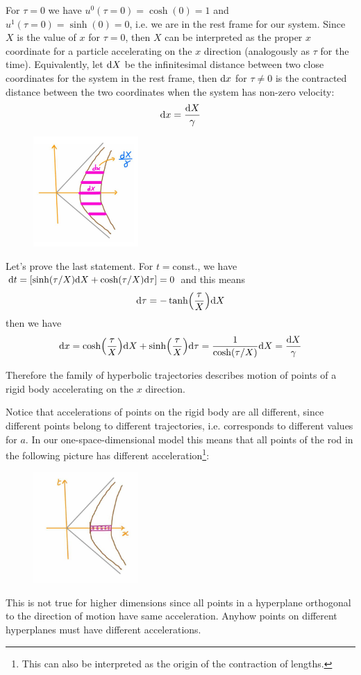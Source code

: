 \documentclass[../main/main.tex]{subfiles}
\begin{document}
For $\tau=0$ we have $u^0(\tau=0)=\cosh(0)=1$ and $u^1(\tau=0)=\sinh(0)=0$, i.e. we are in the rest frame for our system. Since $X$ is the value of $x$ for $\tau=0$, then $X$ can be interpreted as the proper $x$ coordinate for a particle accelerating on the $x$ direction (analogously as $\tau$ for the time). Equivalently, let $\textup{d} X$ be the infinitesimal distance between two close coordinates for the system in the rest frame, then $\textup{d} x$ for $\tau\neq0$ is the contracted distance between the two coordinates when the system has non-zero velocity:
\[\textup{d} x=\frac{\textup{d} X}\gamma\]
\begin{figure}[H]
\centering
\includegraphics[width=4cm]{../img/X-proper-lenght-Rindler.jpg}
\end{figure}
Let's prove the last statement. For $t=$const., we have $\textup{d} t=[\sinh(\tau/X)\textup{d} X+\cosh(\tau/X)\textup{d}\tau]=0$ and this means
\[\textup{d}\tau=-\tanh(\frac\tau X)\textup{d} X\]
then we have
\[\textup{d} x=\cosh(\frac\tau X)\textup{d} X+\sinh(\frac\tau X)\textup{d}\tau=\frac1{\cosh(\tau/X)}\textup{d} X=\frac{\textup{d} X}\gamma\]

Therefore the family of hyperbolic trajectories describes motion of points of a rigid body accelerating on the $x$ direction. 

Notice that accelerations of points on the rigid body are all different, since different points belong to different trajectories, i.e. corresponds to different values for $a$. In our one-space-dimensional model this means that all points of the rod in the following picture has different acceleration\footnote{This can also be interpreted as the origin of the contraction of lengths.}:
\begin{figure}[H]
\centering
\includegraphics[width=4cm]{../img/acceleration-points-rigid-body.jpg}
\end{figure}
This is not true for higher dimensions since all points in a hyperplane orthogonal to the direction of motion have same acceleration. Anyhow points on different hyperplanes must have different accelerations.
\end{document}
